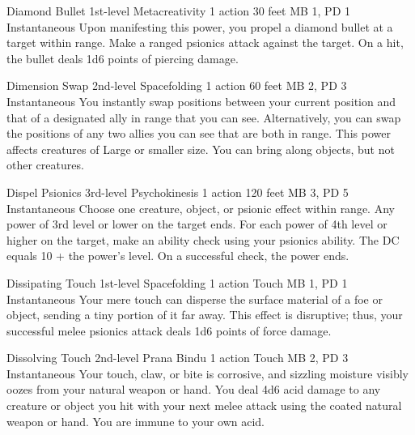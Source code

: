 \DndPowerHeader%
  {Diamond Bullet}
  {1st-level Metacreativity}
  {1 action}
  {30 feet}
  {MB 1, PD 1}
  {Instantaneous}
  Upon manifesting this power,
  you propel a diamond bullet at a target within range.
  Make a ranged psionics attack against the target.
  On a hit, the bullet deals 1d6 points of piercing damage.

\DndPowerHeader%
  {Dimension Swap}
  {2nd-level Spacefolding}
  {1 action}
  {60 feet}
  {MB 2, PD 3}
  {Instantaneous}
  You instantly swap positions between your current position
  and that of a designated ally in range that you can see.
  Alternatively, you can swap the positions of
  any two allies you can see that are both in range.
  This power affects creatures of Large or smaller size.
  You can bring along objects, but not other creatures.

\DndPowerHeader%
  {Dispel Psionics}
  {3rd-level Psychokinesis}
  {1 action}
  {120 feet}
  {MB 3, PD 5}
  {Instantaneous}
  Choose one creature, object, or psionic effect within range.
  Any power of 3rd level or lower on the target ends.
  For each power of 4th level or higher on the target,
  make an ability check using your psionics ability.
  The DC equals 10 + the power's level.
  On a successful check, the power ends.

\DndPowerHeader%
  {Dissipating Touch}
  {1st-level Spacefolding}
  {1 action}
  {Touch}
  {MB 1, PD 1}
  {Instantaneous}
Your mere touch can disperse the surface material of a foe or object,
sending a tiny portion of it far away.
This effect is disruptive; thus,
your successful melee psionics attack deals 1d6 points of force damage.

\DndPowerHeader%
  {Dissolving Touch}
  {2nd-level Prana Bindu}
  {1 action}
  {Touch}
  {MB 2, PD 3}
  {Instantaneous}
  Your touch, claw, or bite is corrosive,
  and sizzling moisture visibly oozes from your
  natural weapon or hand.
  You deal 4d6 acid damage to any creature or object
  you hit with your next melee attack using the coated
  natural weapon or hand.
  You are immune to your own acid.

